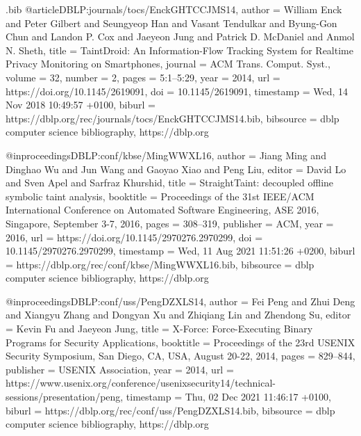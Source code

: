\begin{filecontents}{\jobname.bib}
@article{DBLP:journals/tocs/EnckGHTCCJMS14,
  author       = {William Enck and
                  Peter Gilbert and
                  Seungyeop Han and
                  Vasant Tendulkar and
                  Byung{-}Gon Chun and
                  Landon P. Cox and
                  Jaeyeon Jung and
                  Patrick D. McDaniel and
                  Anmol N. Sheth},
  title        = {TaintDroid: An Information-Flow Tracking System for Realtime Privacy
                  Monitoring on Smartphones},
  journal      = {{ACM} Trans. Comput. Syst.},
  volume       = {32},
  number       = {2},
  pages        = {5:1--5:29},
  year         = {2014},
  url          = {https://doi.org/10.1145/2619091},
  doi          = {10.1145/2619091},
  timestamp    = {Wed, 14 Nov 2018 10:49:57 +0100},
  biburl       = {https://dblp.org/rec/journals/tocs/EnckGHTCCJMS14.bib},
  bibsource    = {dblp computer science bibliography, https://dblp.org}
}

@inproceedings{DBLP:conf/kbse/MingWWXL16,
  author       = {Jiang Ming and
                  Dinghao Wu and
                  Jun Wang and
                  Gaoyao Xiao and
                  Peng Liu},
  editor       = {David Lo and
                  Sven Apel and
                  Sarfraz Khurshid},
  title        = {StraightTaint: decoupled offline symbolic taint analysis},
  booktitle    = {Proceedings of the 31st {IEEE/ACM} International Conference on Automated
                  Software Engineering, {ASE} 2016, Singapore, September 3-7, 2016},
  pages        = {308--319},
  publisher    = {{ACM}},
  year         = {2016},
  url          = {https://doi.org/10.1145/2970276.2970299},
  doi          = {10.1145/2970276.2970299},
  timestamp    = {Wed, 11 Aug 2021 11:51:26 +0200},
  biburl       = {https://dblp.org/rec/conf/kbse/MingWWXL16.bib},
  bibsource    = {dblp computer science bibliography, https://dblp.org}
}

@inproceedings{DBLP:conf/uss/PengDZXLS14,
  author       = {Fei Peng and
                  Zhui Deng and
                  Xiangyu Zhang and
                  Dongyan Xu and
                  Zhiqiang Lin and
                  Zhendong Su},
  editor       = {Kevin Fu and
                  Jaeyeon Jung},
  title        = {X-Force: Force-Executing Binary Programs for Security Applications},
  booktitle    = {Proceedings of the 23rd {USENIX} Security Symposium, San Diego, CA,
                  USA, August 20-22, 2014},
  pages        = {829--844},
  publisher    = {{USENIX} Association},
  year         = {2014},
  url          = {https://www.usenix.org/conference/usenixsecurity14/technical-sessions/presentation/peng},
  timestamp    = {Thu, 02 Dec 2021 11:46:17 +0100},
  biburl       = {https://dblp.org/rec/conf/uss/PengDZXLS14.bib},
  bibsource    = {dblp computer science bibliography, https://dblp.org}
}


\end{filecontents}
